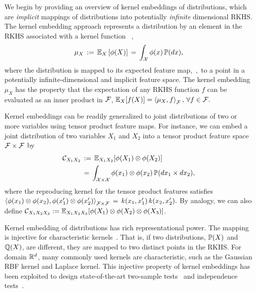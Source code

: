 \documentclass{article}
\begin{document}
We begin by providing an overview of kernel embeddings of distributions, which are \emph{implicit} mappings of distributions into potentially \emph{infinite} dimensional RKHS.
The kernel embedding approach represents a distribution by an element in the RKHS associated with a kernel function \, \cite{SmoGreSonSch07,SriGreFukLanetal08},
\begin{align}
  \mu_{X} \, := \, \mathbb{E}_{X} \left[\phi(X)\right] \, = \, \int_{\mathcal{X}} \phi(x) \, \mathbb{P}(dx),  \label{eq:embedding}
\end{align}
where the distribution is mapped to its expected feature map,~\ie,~to a point in a potentially infinite-dimensional and implicit feature space.
 The kernel embedding $\mu_{X}$ has the property that the expectation of any RKHS function $f$ can be evaluated as an inner product in $\mathcal{F}$,
$
  \mathbb{E}_{X} [f(X)] = \left\langle \mu_{X},f \right\rangle_{\mathcal{F}}, \, \forall f\in\mathcal{F}.
$

Kernel embeddings can be readily generalized to joint distributions of two or more variables using tensor product feature maps. For instance, we can embed a joint distribution of two variables $X_1$ and $X_2$ into a tensor product feature space $\mathcal{F}\times \mathcal{F}$ by
\begin{align}
    \mathcal{C}_{X_1X_2} \, &:= \, \mathbb{E}_{X_1X_2}[\phi(X_1)\otimes \phi(X_2)] \\
    \, &= \, \int_{\mathcal{X} \times \mathcal{X}} \phi(x_1) \otimes \phi(x_2) \, \mathbb{P}(dx_1 \times dx_2),
\end{align}
where the reproducing kernel for the tensor product features satisfies
$
	\left\langle \phi(x_1)\otimes \phi(x_2) ,\phi(x_1')\otimes \phi(x_2')  \right\rangle_{\mathcal{F}\times \mathcal{F}} \, = \,  k(x_1,x_1')\,k(x_2,x_2').
$
By analogy, we can also define $\mathcal{C}_{X_1X_2X_3} := \mathbb{E}_{X_1X_2X_3}[\phi(X_1)\otimes\phi(X_2)\otimes \phi(X_3)]$.

Kernel embedding of distributions has rich representational power. The mapping is injective for characteristic kernels~\cite{SriGreFukLanetal08}. That is, if two distributions, $\mathbb{P}(X)$ and $\mathbb{Q}(X)$, are different, they are mapped to two distinct points in the RKHS. For domain $\mathbb{R}^d$, many commonly used kernels are characteristic, such as the Gaussian RBF kernel and Laplace kernel.
This injective property of kernel embeddings has been exploited to design  state-of-the-art two-sample tests~\cite{GreBorRasSchetal12} and  independence tests~\cite{GreFukTeoSonetal08}.
\end{document}

